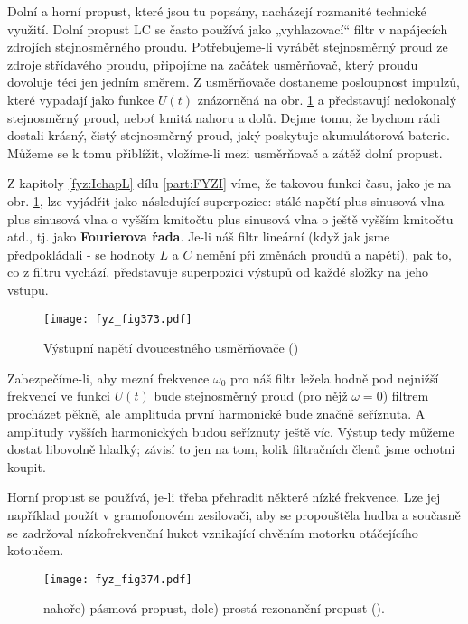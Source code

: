 {  Dolní a horní propust, které jsou tu popsány, nacházejí rozmanité technické využití. Dolní 
  propust LC se často používá jako „vyhlazovací“ filtr v napájecích zdrojích stejnosměrného proudu. 
  Potřebujeme-li vyrábět stejnosměrný proud ze zdroje střídavého proudu, připojíme na začátek 
  usměrňovač, který proudu dovoluje téci jen jedním směrem. Z usměrňovače dostaneme posloupnost 
  impulzů, které vypadají jako funkce \(U(t)\) znázorněná na obr. \ref{fyz:fig373} a představují 
  nedokonalý stejnosměrný proud, neboť kmitá nahoru a dolů. Dejme tomu, že bychom rádi dostali 
  krásný, čistý stejnosměrný proud, jaký poskytuje akumulátorová baterie. Můžeme se k tomu 
  přiblížit, vložíme-li mezi usměrňovač a zátěž dolní propust. 
  
  Z kapitoly \ref{fyz:IchapL} dílu \ref{part:FYZI} víme, že takovou funkci času, jako je na obr. 
  \ref{fyz:fig373}, lze vyjádřit jako následující superpozice: stálé napětí plus sinusová vlna plus 
  sinusová vlna o vyšším kmitočtu plus sinusová vlna o ještě vyšším kmitočtu atd., tj. jako 
  \textbf{Fourierova řada}. Je-li náš filtr lineární (když jak jsme předpokládali - se hodnoty 
  \(L\) a \(C\) nemění při změnách proudů a napětí), pak to, co z filtru vychází, představuje 
  superpozici výstupů od každé složky na jeho vstupu.
  
  \begin{figure}[ht!] %
    \centering
    \texttt{[image: fyz\_fig373.pdf]}
    \caption{Výstupní napětí dvoucestného usměrňovače
             (\cite[s.~412]{Feynman02})}
    \label{fyz:fig373}
  \end{figure}
  
  Zabezpečíme-li, aby mezní frekvence \(\omega_0\) pro náš filtr ležela hodně pod nejnižší 
  frekvencí ve funkci \(U(t)\) bude stejnosměrný proud (pro nějž \(\omega = 0\)) filtrem procházet 
  pěkně, ale amplituda první harmonické bude značně seříznuta. A amplitudy vyšších harmonických 
  budou seříznuty ještě víc. Výstup tedy můžeme dostat libovolně hladký; závisí to jen na tom, 
  kolik filtračních členů jsme ochotni koupit.
  
  Horní propust se používá, je-li třeba přehradit některé nízké frekvence. Lze jej například použít 
  v gramofonovém zesilovači, aby se propouštěla hudba a současně se zadržoval nízkofrekvenční hukot 
  vznikající chvěním motorku otáčejícího kotoučem.
  
  \begin{figure}[ht!] %
    \centering
    \texttt{[image: fyz\_fig374.pdf]}
    \caption{nahoře) pásmová propust, dole) prostá rezonanční propust
             (\cite[s.~412]{Feynman02}).}
    \label{fyz:fig374}
  \end{figure}
  
}

